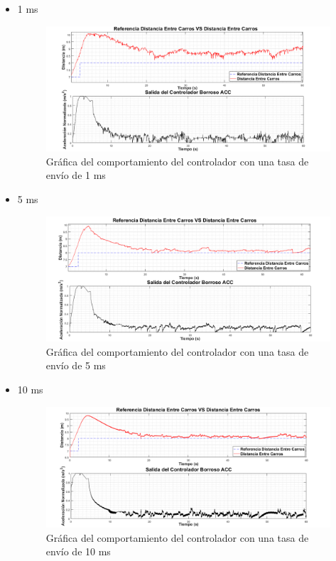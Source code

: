 \begin{itemize}
\item 1 ms
\begin{figure}[H]
	\centering
		\includegraphics[scale=0.5]{Imagenes/1sv}
		\caption{Gráfica del comportamiento del controlador con una tasa de envío de 1 ms}
		\label{fig:cv1}
\end{figure}
\item 5 ms
\begin{figure}[H]
	\centering
		\includegraphics[scale=0.48]{Imagenes/5sv}
		\caption{Gráfica del comportamiento del controlador con una tasa de envío de 5 ms}
		\label{fig:cv5}
\end{figure}	
\item 10 ms
\begin{figure}[H]
	\centering
		\includegraphics[scale=0.49]{Imagenes/10cv}
		\caption{Gráfica del comportamiento del controlador con una tasa de envío de 10 ms}

\end{figure}
\end{itemize}
